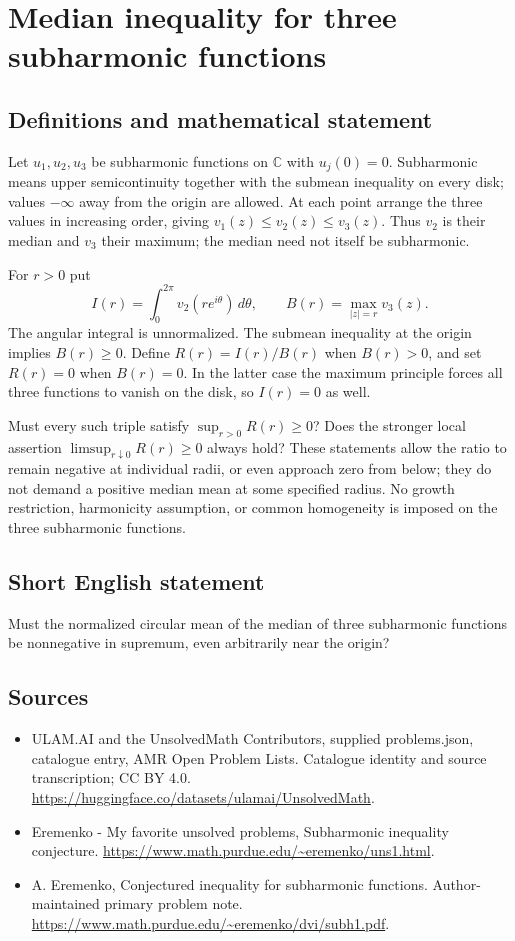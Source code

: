 \documentclass[11pt,a4paper]{article}
\begin{document}
\section*{Median inequality for three subharmonic functions}\label{statement}

\subsection{Definitions and mathematical statement}
Let $u_1,u_2,u_3$ be subharmonic functions on
$\mathbb C$ with $u_j(0)=0$. Subharmonic means
upper semicontinuity together with the submean inequality
on every disk; values $-\infty$ away from the origin
are allowed. At each point arrange the three values
in increasing order, giving
$v_1(z)\leq v_2(z)\leq v_3(z)$.
Thus $v_2$ is their median and $v_3$ their maximum;
the median need not itself be subharmonic.

For $r>0$ put
\[
 I(r)=\int_0^{2\pi}v_2(re^{i\theta})\,d\theta,\qquad
 B(r)=\max_{|z|=r}v_3(z).
\]
The angular integral is unnormalized. The submean
inequality at the origin implies $B(r)\geq0$.
Define $R(r)=I(r)/B(r)$ when $B(r)>0$,
and set $R(r)=0$ when $B(r)=0$.
In the latter case the maximum principle forces
all three functions to vanish on the disk,
so $I(r)=0$ as well.

Must every such triple satisfy
$\sup_{r>0}R(r)\geq0$?
Does the stronger local assertion
$\limsup_{r\downarrow0}R(r)\geq0$ always hold?
These statements allow the ratio to remain
negative at individual radii, or even approach
zero from below; they do not demand a positive
median mean at some specified radius.
No growth restriction, harmonicity assumption,
or common homogeneity is imposed on the three
subharmonic functions.
\subsection{Short English statement}
Must the normalized circular mean of the median of three subharmonic functions be nonnegative in supremum, even arbitrarily near the origin?
\subsection{Sources}
\begin{itemize}
\item[S1] ULAM.AI and the UnsolvedMath Contributors, supplied problems.json, catalogue entry, AMR Open Problem Lists. Catalogue identity and source transcription; CC BY 4.0.
\url{https://huggingface.co/datasets/ulamai/UnsolvedMath}.
\item[S2] Eremenko - My favorite unsolved problems, Subharmonic inequality conjecture. 
\url{https://www.math.purdue.edu/~eremenko/uns1.html}.
\item[S3] A. Eremenko, Conjectured inequality for subharmonic functions. Author-maintained primary problem note.
\url{https://www.math.purdue.edu/~eremenko/dvi/subh1.pdf}.
\end{itemize}
\end{document}
